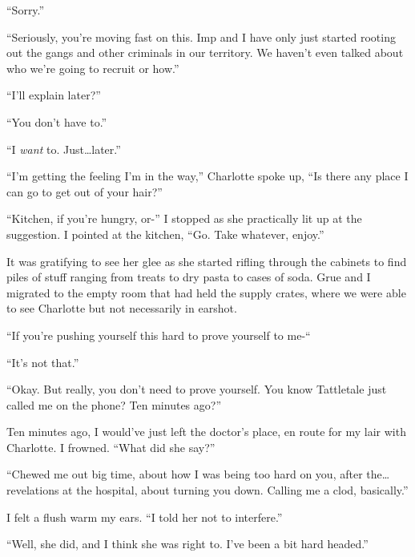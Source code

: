 ``Sorry.''



``Seriously, you're moving fast on this.  Imp and I have only just started rooting out the gangs and other criminals in our territory.  We haven't even talked about who we're going to recruit or how.''



``I'll explain later?''



``You don't have to.''



``I \emph{want} to.  Just\ldots later.''



``I'm getting the feeling I'm in the way,'' Charlotte spoke up, ``Is there any place I can go to get out of your hair?''



``Kitchen, if you're hungry, or-''  I stopped as she practically lit up at the suggestion.  I pointed at the kitchen, ``Go.  Take whatever, enjoy.''



It was gratifying to see her glee as she started rifling through the cabinets to find piles of stuff ranging from treats to dry pasta to cases of soda.  Grue and I migrated to the empty room that had held the supply crates, where we were able to see Charlotte but not necessarily in earshot.



``If you're pushing yourself this hard to prove yourself to me-``



``It's not that.''



``Okay.  But really, you don't need to prove yourself.  You know Tattletale just called me on the phone?  Ten minutes ago?''



Ten minutes ago, I would've just left the doctor's place, en route for my lair with Charlotte.  I frowned.  ``What did she say?''



``Chewed me out big time, about how I was being too hard on you, after the\ldots revelations at the hospital, about turning you down.  Calling me a clod, basically.''



I felt a flush warm my ears.  ``I told her not to interfere.''



``Well, she did, and I think she was right to.  I've been a bit hard headed.''



